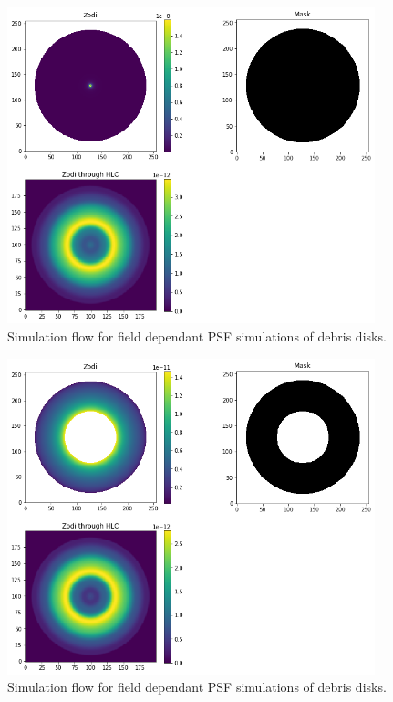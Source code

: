 \documentclass[]{spie}  %
\begin{document}
\begin{figure}[htbp]
    \centering
    \includegraphics[width=0.95\textwidth]{Unknown-7.png}
    \caption{Simulation flow for field dependant PSF simulations of debris disks.}
    \label{fig:my_label}
    \end{figure}

    \begin{figure}[htbp]
    \includegraphics[width=0.95\textwidth]{Unknown-4.png}
    \caption{Simulation flow for field dependant PSF simulations of debris disks.}
    \label{fig:my_label}
\end{figure}
\end{document}
